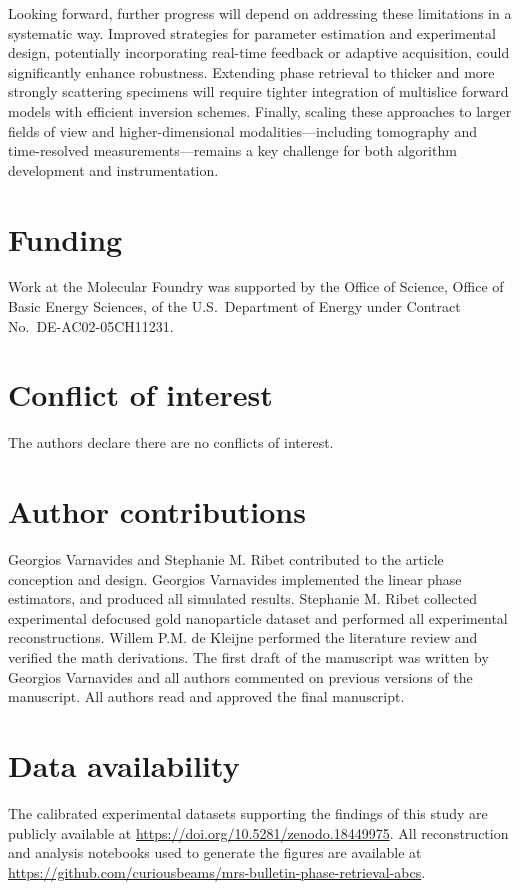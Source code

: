 \documentclass[pdflatex,sn-aps,iicol]{sn-jnl}%
\begin{document}
Looking forward, further progress will depend on addressing these limitations in a systematic way.
Improved strategies for parameter estimation and experimental design, potentially incorporating real-time feedback or adaptive acquisition, could significantly enhance robustness.
Extending phase retrieval to thicker and more strongly scattering specimens will require tighter integration of multislice forward models with efficient inversion schemes.
Finally, scaling these approaches to larger fields of view and higher-dimensional modalities—including tomography and time-resolved measurements—remains a key challenge for both algorithm development and instrumentation.

\section*{Funding}

Work at the Molecular Foundry was supported by the Office of Science, Office of Basic Energy Sciences, of the U.S.\ Department of Energy under Contract No.\ DE-AC02-05CH11231.

\section*{Conflict of interest}

The authors declare there are no conflicts of interest.

\section*{Author contributions}

Georgios Varnavides and Stephanie M. Ribet contributed to the article conception and design.
Georgios Varnavides implemented the linear phase estimators, and produced all simulated results.
Stephanie M. Ribet collected experimental defocused gold nanoparticle dataset and performed all experimental reconstructions.
Willem P.M. de Kleijne performed the literature review and verified the math derivations.
The first draft of the manuscript was written by Georgios Varnavides and all authors commented on previous versions of the manuscript.
All authors read and approved the final manuscript.

\section*{Data availability}

The calibrated experimental datasets supporting the findings of this study are publicly available at \url{https://doi.org/10.5281/zenodo.18449975}.
All reconstruction and analysis notebooks used to generate the figures are available at \url{https://github.com/curiousbeams/mrs-bulletin-phase-retrieval-abcs}.


\end{document}
